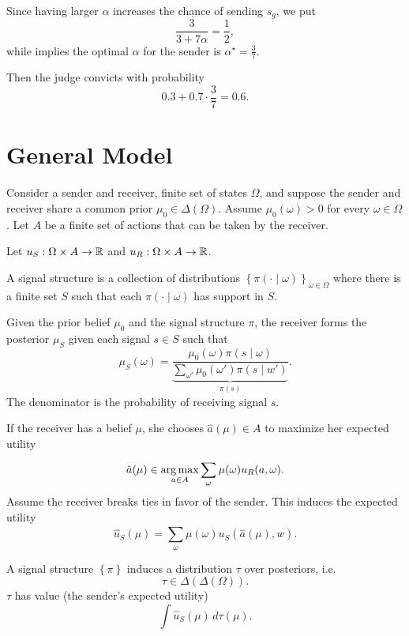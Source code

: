 Since having larger $\alpha$ increases the chance of sending $s_g$, we put \[
	\frac{3}{3+7\alpha}  = \frac{1}{2}
,\] while implies the optimal $\alpha$ for the sender is $\alpha^\star = \frac{3}{7}$.

Then the judge convicts with probability \[
	0.3 + 0.7 \cdot \frac{3}{7} = 0.6
.\] 

\section{General Model}

Consider a sender and receiver, finite set of states $\Omega$, and suppose the sender and receiver share a common prior $\mu_0 \in \Delta\left( \Omega \right)$. Assume $\mu_0(\omega) > 0$ for every $\omega \in \Omega$. Let $A$ be a finite set of actions that can be taken by the receiver.

Let $u_S: \Omega \times A \to \mathbb{R}$ and $u_R: \Omega \times A \to \mathbb{R}$.

\begin{definition}
	A signal structure is a collection of distributions $\left\{\pi(\cdot \mid \omega)\right\}_{\omega \in \Omega}$ where there is a finite set $S$ such that each $\pi(\cdot\mid \omega)$ has support in $S$.
\end{definition}

Given the prior belief $\mu_0$ and the signal structure $\pi$, the receiver forms the posterior $\mu_S$ given each signal $s \in S$ such that \[
	\mu_S(\omega) = \frac{\mu_0(\omega)\pi(s \mid \omega)}{\underbrace{\sum_{\omega'} \mu_0(\omega') \pi(s \mid w')}_{\pi(s)}}
.\] 
The denominator is the probability of receiving signal $s$.

If the receiver has a belief $\mu$, she chooses $\hat{a}(\mu) \in A$ to maximize her expected utility \[
	\hat{a}(\mu) \in \operatorname*{arg\,max}_{a \in A} \sum\limits_{\omega}^{} \mu(\omega) u_R(a,\omega)
.\] 
Assume the receiver breaks ties in favor of the sender.
This induces the expected utility \[
	\hat{u}_S(\mu) = \sum\limits_{\omega}^{} \mu(\omega) u_S(\hat{a}(\mu), w)
.\] 

A signal structure $\left\{\pi\right\}$ induces a distribution $\tau$ over posteriors, i.e. \[
	\tau \in \Delta\left( \Delta (\Omega) \right)
.\] 
$\tau$ has value (the sender's expected utility) \[
	\int \hat{u}_S(\mu)\,d \tau(\mu)
.\] 

